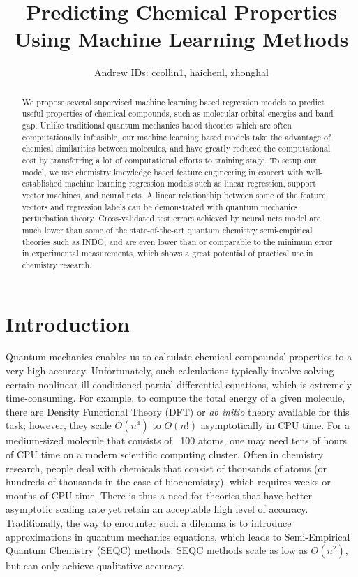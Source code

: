 \documentclass[10pt, oneside]{article}   	%
\title{Predicting Chemical Properties Using Machine Learning Methods}
\author{Andrew IDs: ccollin1, haichenl, zhonghal}
\begin{document}
\maketitle

\begin{abstract}

We propose several supervised machine learning based regression models to predict useful properties of chemical compounds, such as molecular orbital energies and band gap. Unlike traditional quantum mechanics based theories which are often computationally infeasible, our machine learning based models take the advantage of chemical similarities between molecules, and have greatly reduced the computational cost by transferring a lot of computational efforts to training stage. To setup our model, we use chemistry knowledge based feature engineering in concert with well-established machine learning regression models such as linear regression, support vector machines, and neural nets. A linear relationship between some of the feature vectors and regression labels can be demonstrated with quantum mechanics perturbation theory. Cross-validated test errors achieved by neural nets model are much lower than some of the state-of-the-art quantum chemistry semi-empirical theories such as INDO, and are even lower than or comparable to the minimum error in experimental measurements, which shows a great potential of practical use in chemistry research.

\end{abstract}



\section{Introduction}
\noindent Quantum mechanics enables us to calculate chemical compounds' properties to a very high accuracy. Unfortunately, such calculations typically involve solving certain nonlinear ill-conditioned partial differential equations, which is extremely time-consuming. For example, to compute the total energy of a given molecule, there are Density Functional Theory (DFT) or \textit{ab initio} theory available for this task; however, they scale $O(n^4)$ to $O(n!)$ asymptotically in CPU time. For a medium-sized molecule that consists of ~100 atoms, one may need tens of hours of CPU time on a modern scientific computing cluster. Often in chemistry research, people deal with chemicals that consist of thousands of atoms (or hundreds of thousands in the case of biochemistry), which requires weeks or months of CPU time. There is thus a need for theories that have better asymptotic scaling rate yet retain an acceptable high level of accuracy. Traditionally, the way to encounter such a dilemma is to introduce approximations in quantum mechanics equations, which leads to Semi-Empirical Quantum Chemistry (SEQC) methods. SEQC methods scale as low as $O(n^2)$, but can only achieve qualitative accuracy. \\
\end{document}
